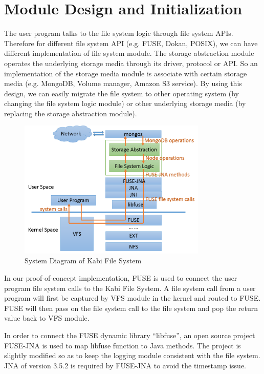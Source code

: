 \section{Module Design and Initialization}

    The user program talks to the file system logic through file system APIs. Therefore for different file system API (e.g. FUSE, Dokan, POSIX), we can have different implementation of file system module. The storage abstraction module operates the underlying storage media through its driver, protocol or API. So an implementation of the storage media module is associate with certain storage media (e.g. MongoDB, Volume manager, Amazon S3 service). By using this design, we can easily migrate the file system to other operating system (by changing the file system logic module) or other underlying storage media (by replacing the storage abstraction module).

\begin{figure}[hbtp]
\centering
\includegraphics[width=0.8\textwidth]{Chapter-3/figs/fig1.png}
\caption{System Diagram of Kabi File System}
\label{fig:diagram}
\end{figure}

	In our proof-of-concept implementation, FUSE is used to connect the user program file system calls to the Kabi File System. A file system call from a user program will first be captured by VFS module in the kernel and routed to FUSE. FUSE will then pass on the file system call to the file system and pop the return value back to VFS module.

    In order to connect the FUSE dynamic library “libfuse”, an open source project FUSE-JNA is used to map libfuse function to Java methods. The project is slightly modified so as to keep the logging module consistent with the file system. JNA of version 3.5.2 is required by FUSE-JNA to avoid the timestamp issue.

